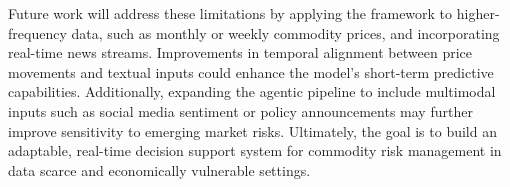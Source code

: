 \documentclass[12pt]{elsarticle}
\begin{document}
Future work will address these limitations by applying the framework to higher-frequency data, such as monthly or weekly commodity prices, and incorporating real-time news streams. Improvements in temporal alignment between price movements and textual inputs could enhance the model’s short-term predictive capabilities. Additionally, expanding the agentic pipeline to include multimodal inputs such as social media sentiment or policy announcements may further improve sensitivity to emerging market risks. Ultimately, the goal is to build an adaptable, real-time decision support system for commodity risk management in data scarce and economically vulnerable settings.



\newpage
 


% 
%








\end{document}
